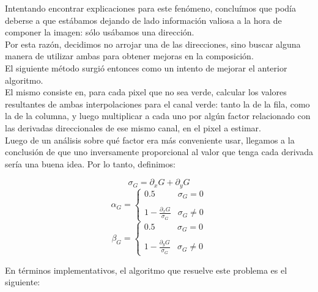 \documentclass[a4paper]{article}
\begin{document}
Intentando encontrar explicaciones para este fenómeno, concluímos que podía deberse a que estábamos dejando de lado información valiosa a la hora de componer la imagen: sólo usábamos una dirección.\\
\indent Por esta razón, decidimos no arrojar una de las direcciones, sino buscar alguna manera de utilizar ambas para obtener mejoras en la composición.\\
El siguiente método surgió entonces como un intento de mejorar el anterior algoritmo.\\

El mismo consiste en, para cada pixel que no sea verde, calcular los valores resultantes de ambas interpolaciones para el canal verde: tanto la de la fila, como la de la columna, y luego multiplicar a cada uno por algún factor relacionado con las derivadas direccionales de ese mismo canal, en el pixel a estimar.\\

Luego de un análisis sobre qué factor era más conveniente usar, llegamos a la conclusión de que uno inversamente proporcional al valor que tenga cada derivada sería una buena idea. Por lo tanto, definimos:

\[\sigma_G = \partial_xG + \partial_yG \]
\smallskip
\[\alpha_G =
\begin{cases}
0.5 & \sigma_G = 0 \\
  &  \\
1-\frac{\partial_xG}{\sigma_G} & \sigma_G \neq 0
\end{cases}
\]
\medskip
\[\beta_G =
\begin{cases}
0.5 & \sigma_G = 0 \\
  &  \\
1-\frac{\partial_yG}{\sigma_G} & \sigma_G \neq 0
\end{cases}
\]
\pagebreak

En términos implementativos, el algoritmo que resuelve este problema es el siguiente:
\end{document}
